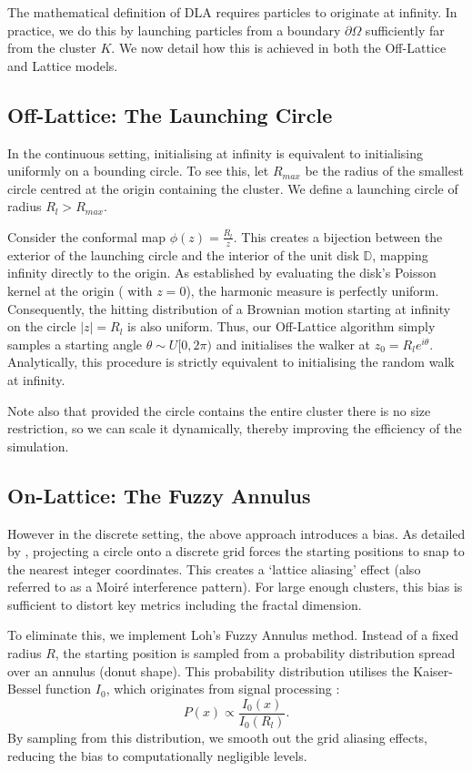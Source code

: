 \documentclass[12pt, a4paper, oneside]{report}
\theoremstyle{remark}
\begin{document}
The mathematical definition of DLA requires particles to originate at infinity. In practice, we do this by launching particles from a boundary $\partial \Omega$ sufficiently far from the cluster $K$. We now detail how this is achieved in both the Off-Lattice and Lattice models.
\subsection{Off-Lattice: The Launching Circle}
In the continuous setting, initialising at infinity is equivalent to initialising uniformly on a bounding circle.
To see this, let $R_{max}$ be the radius of the smallest circle centred at the origin containing the cluster. We define a launching circle of radius $R_{l} > R_{max}$.

Consider the conformal map $\phi(z) = \frac{R_{l}}{z}$. This creates a bijection between the exterior of the launching circle and the interior of the unit disk $\mathbb{D}$, mapping infinity directly to the origin. As established by evaluating the disk's Poisson kernel at the origin ( with $z=0$), the harmonic measure is perfectly uniform. Consequently, the hitting distribution of a Brownian motion starting at infinity on the circle $|z|=R_{l}$ is also uniform.
Thus, our Off-Lattice algorithm simply samples a starting angle $\theta \sim U[0, 2\pi)$ and initialises the walker at $z_0 = R_{l}e^{i\theta}$. 
Analytically, this procedure is strictly equivalent to initialising the random walk at infinity.

Note also that provided the circle contains the entire cluster there is no size restriction, so we can scale it dynamically, thereby improving the efficiency of the simulation.

\subsection{On-Lattice: The Fuzzy Annulus}
However in the discrete setting, the above approach introduces a bias. As detailed by \citet{Loh2014}, projecting a circle onto a discrete grid forces the starting positions to snap to the nearest integer coordinates. This creates a `lattice aliasing' effect (also referred to as a Moir\'e interference pattern). For large enough clusters, this bias is sufficient to distort key metrics including the fractal dimension.

To eliminate this, we implement Loh's Fuzzy Annulus method. Instead of a fixed radius $R$, the starting position is sampled from a probability distribution spread over an annulus (donut shape). This probability distribution utilises the Kaiser-Bessel function $I_0$, which originates from signal processing \cite{kaiser1980}:
\begin{equation*}
    P(x) \propto \frac{I_0(x)}{I_0(R_{l})}.
\end{equation*}
By sampling from this distribution, we smooth out the grid aliasing effects, reducing the bias to computationally negligible levels.
\end{document}
